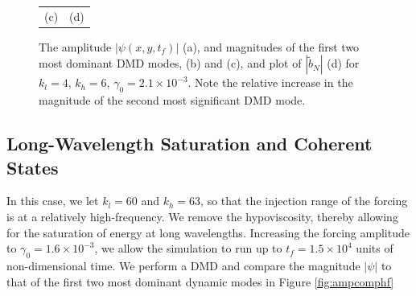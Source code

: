 \documentclass[a4paper,11pt]{article}
\begin{document}
\begin{figure}
\begin{tabular}{cc}
(c) & (d)
\end{tabular}
\caption{The amplitude $\left|\psi(x,y,t_{f})\right|$ (a), and magnitudes of the first two most dominant DMD modes, (b) and (c), and plot of $\left|\tilde{b}_{N}\right|$ (d) for $k_{l}=4$, $k_{h}=6$, $\gamma_{0}=2.1\times 10^{-3}$. Note the relative increase in the magnitude of the second most significant DMD mode.}
\label{fig:ampcomplf}
\end{figure}

\subsection*{Long-Wavelength Saturation and Coherent States}
In this case, we let $k_{l}=60$ and $k_{h}=63$, so that the injection range of the forcing is at a relatively high-frequency.  We remove the hypoviscosity, thereby allowing for the saturation of energy at long wavelengths.  Increasing the forcing amplitude to $\gamma_{0}=1.6\times 10^{-3}$, we allow the simulation to run up to $t_{f}=1.5\times 10^{4}$ units of non-dimensional time.  We perform a DMD and compare the magnitude $\left|\psi\right|$ to that of the first two most dominant dynamic modes in Figure \ref{fig:ampcomphf}
\end{document}
